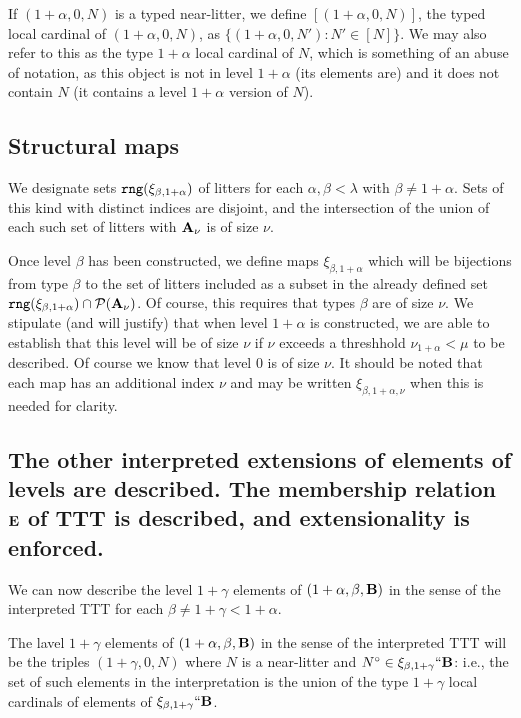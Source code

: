 \documentclass[12pt]{article}
\begin{document}
If $(1+\alpha,0,N)$ is a typed near-litter, we define $[(1+\alpha,0,N)]$, the typed local cardinal of $(1+\alpha,0,N)$, as $\{(1+\alpha,0,N'):N' \in [N]\}$.  We may also refer to this as the type $1+\alpha$ local cardinal of $N$, which is something of an abuse of notation, as this object is not in level $1+\alpha$ (its elements are) and it does not contain $N$
(it contains a level $1+\alpha$ version of $N$).

\subsection{Structural maps}

We designate sets ${\tt rng}(\xi_{\beta,1+\alpha})$ of litters for each $\alpha, \beta <\lambda$ with $\beta \neq 1+\alpha$.  Sets of this kind with distinct indices are disjoint,
and the intersection of the union of each such set of litters with ${\bf A}_\nu$ is of size $\nu$.

Once level $\beta$ has been constructed, we define maps $\xi_{\beta,1+\alpha}$ which will be bijections from type $\beta$ to the set of litters included as a subset in the already defined set
${\tt rng}(\xi_{\beta,1+\alpha})\cap {\cal P}({\bf A}_\nu)$.  Of course, this requires that types $\beta$ are of size $\nu$.  We stipulate (and will justify) that when
level $1+\alpha$ is constructed, we are able to establish that this level will be of size $\nu$ if $\nu$ exceeds a threshhold $\nu_{1+\alpha}<\mu$ to be described.  Of course we know that level 0 is of size $\nu$.  It should be noted that each map has an additional index $\nu$ and may be written $\xi_{\beta,1+\alpha,\nu}$ when this is needed for clarity.

\subsection{The other interpreted extensions of elements of levels are described.  The membership relation ${\bf E}$ of TTT is described, and extensionality is enforced.}

We can now describe the level $1+\gamma$ elements of $(1+\alpha,\beta,{\bf B})$ in the sense of the interpreted TTT for each $\beta \neq 1+\gamma <1+\alpha$.

The lavel $1+\gamma$ elements of $(1+\alpha,\beta,{\bf B})$ in the sense of the interpreted TTT will be the triples $(1+\gamma,0,N)$ where $N$ is a near-litter and $N^\circ \in \xi_{\beta,1+\gamma}``{\bf B}$:  i.e., the set of such elements in the interpretation is the union of the type $1+\gamma$ local cardinals of elements of $\xi_{\beta,1+\gamma}``{\bf B}$.
\end{document}
